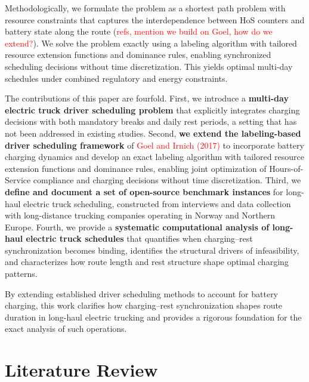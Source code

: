 \documentclass[trsc,dblanonrev]{informs4}
\newcommand{\red}[1]{{\textcolor{red}{#1}}}
\begin{document}
    Methodologically, we formulate the problem as a shortest path problem with resource constraints that captures the interdependence between HoS counters and battery state along the route (\red{refs, mention we build on Goel, how do we extend?}). We solve the problem exactly using a labeling algorithm with tailored resource extension functions and dominance rules, enabling synchronized scheduling decisions without time discretization. This yields optimal multi-day schedules under combined regulatory and energy constraints.

    The contributions of this paper are fourfold. First, we introduce a \textbf{multi-day electric truck driver scheduling problem} that explicitly integrates charging decisions with both mandatory breaks and daily rest periods, a setting that has not been addressed in existing %
    studies. Second, \textbf{we extend the labeling-based driver scheduling framework} of \red{Goel and Irnich (2017)} to incorporate battery charging dynamics and develop an exact labeling algorithm with tailored resource extension functions and dominance rules, enabling joint optimization of Hours-of-Service compliance and charging decisions without time discretization.
    Third, we \textbf{define and document a set of open-source benchmark instances} for long-haul electric truck scheduling, constructed from interviews and data collection with long-distance trucking companies operating in Norway and Northern Europe.
    Fourth, we provide a \textbf{systematic computational analysis of long-haul electric truck schedules} that quantifies when charging–rest synchronization becomes binding, identifies the structural drivers of infeasibility, and characterizes how route length and rest structure shape optimal charging patterns.

    By extending established driver scheduling methods to account for battery charging, this work clarifies how charging–rest synchronization shapes route duration in long-haul electric trucking and provides a rigorous foundation for the exact analysis of such operations.



\section{Literature Review}
\label{Literature Review}
\end{document}
